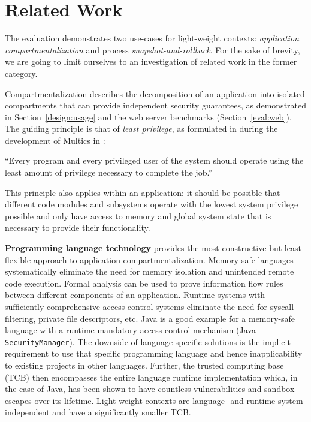 \documentclass[10pt,twocolumn,a4paper]{article}
\begin{document}
\section{Related Work}\label{rel}
The evaluation demonstrates two use-cases for light-weight contexts: \textit{application compartmentalization} and process \textit{snapshot-and-rollback}.
For the sake of brevity, we are going to limit ourselves to an investigation of related work in the former category.

Compartmentalization describes the decomposition of an application into isolated compartments that can provide independent security guarantees, as demonstrated in Section~\ref{design:usage} and the web server benchmarks (Section~\ref{eval:web}).
The guiding principle is that of \textit{least privilege}, as formulated in during the development of Multics in \citeyear{principleofleastprivilege}:%
\begin{displayquote}
\enquote{Every program and every privileged user of the system should operate using the least amount of privilege necessary to complete the job.}
\cite{principleofleastprivilege}
\end{displayquote}
This principle also applies within an application: it should be possible that different code modules and subsystems operate with the lowest system privilege possible and only have access to memory and global system state that is necessary to provide their functionality.

\textbf{Programming language technology} provides the most constructive but least flexible approach to application compartmentalization.
Memory safe languages systematically eliminate the need for memory isolation and unintended remote code execution.
Formal analysis can be used to prove information flow rules between different components of an application.
Runtime systems with sufficiently comprehensive access control systems eliminate the need for syscall filtering, private file descriptors, etc.
Java is a good example for a memory-safe language with a runtime mandatory access control mechanism (Java \lstinline{SecurityManager}).
The downside of language-specific solutions is the implicit requirement to use that specific programming language and hence inapplicability to existing projects in other languages.
Further, the trusted computing base (TCB) then encompasses the entire language runtime implementation which, in the case of Java, has been shown to have countless vulnerabilities and sandbox escapes over its lifetime.
Light-weight contexts are language- and runtime-system-independent and have a significantly smaller TCB.
\cite{javasecurity,bartel2018twentyyearsjavasecuritysandboxescape}
\end{document}
